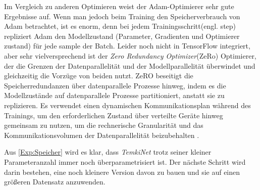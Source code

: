 \documentclass[12pt,a4paper]{scrartcl}
\numberwithin{equation}{section}
\begin{document}
Im Vergleich zu anderen Optimieren weist der Adam-Optimierer sehr gute Ergebnisse auf. Wenn man jedoch beim Training den Speicherverbrauch von Adam betrachtet, ist es  enorm, denn bei jedem Trainingsschritt(engl. step) repliziert Adam den Modellzustand (Parameter, Gradienten und Optimierer zustand) für jede sample der Batch.
Leider noch nicht in TensorFlow integriert, aber sehr vielversprechend ist der \textit{Zero Redundancy Optimizer}(ZeRo) Optimierer, der die Grenzen der Datenparallelität und der Modellparallelität  überwindet und gleichzeitig die Vorzüge von beiden  nutzt. ZeRO beseitigt die Speicherredundanzen über datenparallele Prozesse hinweg, indem es die Modellzustände auf datenparallele Prozesse partitioniert, anstatt sie zu replizieren. Es verwendet einen dynamischen Kommunikationsplan während des Trainings, um den erforderlichen Zustand über verteilte Geräte hinweg gemeinsam zu nutzen, um die rechnerische Granularität und das Kommunikationsvolumen der Datenparallelität beizubehalten \cite{ZeRo}.

Aus \ref{Exp:Speicher} wird es klar, dass \textit{TemkiNet}  trotz seiner kleiner Parameteranzahl immer noch überparametrisiert ist. Der nächste Schritt wird darin bestehen, eine noch kleinere Version davon zu bauen und sie auf einen größeren Datensatz anzuwenden.

\newpage

\end{document}
